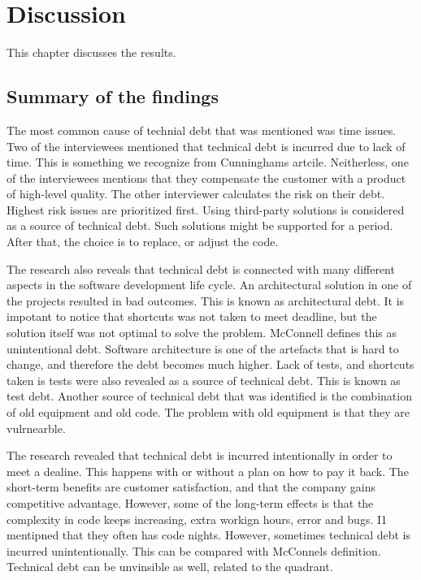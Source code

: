 \chapter{Discussion}
This chapter discusses the results.




\section{Summary of the findings}

The most common cause of technial debt that was mentioned was time issues. Two of the interviewees mentioned that technical debt is incurred due to lack of time. This is something we recognize from Cunninghams artcile. Neitherless, one of the interviewees mentions that they compensate the customer with a product of high-level quality. The other interviewer calculates the risk on their debt. Highest risk issues are prioritized first. Using third-party solutions is considered as a source of technical debt. Such solutions might be supported for a period. After that, the choice is to replace, or adjust the code.

The research also reveals that technical debt is connected with many different aspects in the software development life cycle. An architectural solution in one of the projects resulted in bad outcomes. This is known as architectural debt. It is impotant to notice that shortcuts was not taken to meet deadline, but the solution itself was not optimal to solve the problem. McConnell defines this as unintentional debt. Software architecture is one of the artefacts that is hard to change, and therefore the debt becomes much higher. Lack of tests, and shortcuts taken is tests were also revealed as a source of technical debt. This is known as test debt. Another source of technical debt that was identified is the combination of old equipment and old code. The problem with old equipment is that they are vulrnearble.

The research revealed that technical debt is incurred intentionally in order to meet a dealine. This happens with or without a plan on how to pay it back. The short-term benefits are customer satisfaction, and that the company gains competitive advantage. However, some of the long-term effects is that the complexity in code keeps increasing, extra workign hours, error and bugs. I1 mentipned that they often has code nights. However, sometimes technical debt is incurred unintentionally. This can be compared with McConnels definition. Technical debt can be unvinsible as well, related to the quadrant.

